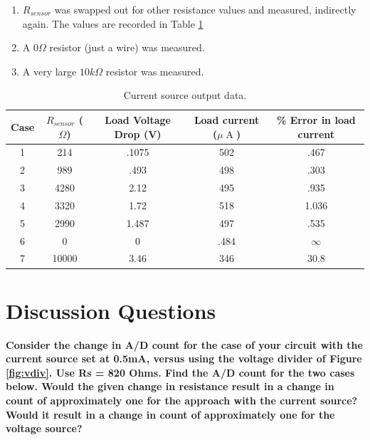 \documentclass[12pt]{article}
\DeclareMathOperator{\A}{A}
\begin{document}
\begin{enumerate}
    \item $R_{sensor}$ was swapped out for other resistance values and measured, indirectly again. The values are recorded in Table \ref{tbl:data}
    \item A $0\Omega$ resistor (just a wire) was measured. 
    \item A very large $10k\Omega$ resistor was measured.
\end{enumerate}

\begin{table}
    \centering
    \caption{Current source output data.}
    \begin{tabular}{|c | c | c || c | c|} 
        \hline
        Case & $R_{sensor}$ ($\Omega$) & Load Voltage Drop (V) & Load current ($\mu\A$) & \% Error in load current \\
        \hline
        1 & 214 & .1075 & 502 & .467 \\
        2 & 989 & .493 & 498 & .303 \\
        3 & 4280 & 2.12 & 495 & .935 \\ 
        4 & 3320\footnotemark & 1.72 & 518 & 1.036 \\
        5 & 2990\footnotemark & 1.487 & 497 & .535 \\
        6 & 0 & 0 & .484\footnotemark & $\infty$ \\
        7 & 10000 & 3.46 & 346 & 30.8 \\
        \hline
    \end{tabular}
    \label{tbl:data}
\end{table}

\section*{Discussion Questions}
\textbf{Consider the change in A/D count for the case of your circuit with the current source set at 0.5mA, versus using the voltage divider of Figure \ref{fig:vdiv}. Use Rs = 820 Ohms. Find the A/D count for the two cases below. Would the given change in resistance result in a change in count of approximately one for the approach with the current source? Would it result in a change in count of approximately one for the voltage source?}
\end{document}
